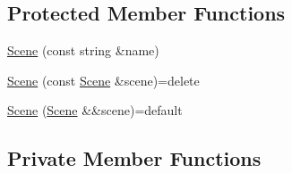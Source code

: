 \subsection*{Protected Member Functions}
\begin{DoxyCompactItemize}
\item 
\hyperlink{classmage_1_1_scene_aab61b38547fc53aa9c5b3b559f4d2e26}{Scene} (const string \&name)
\item 
\hyperlink{classmage_1_1_scene_a88d83ccb2e10549d5370f850b2b4c228}{Scene} (const \hyperlink{classmage_1_1_scene}{Scene} \&scene)=delete
\item 
\hyperlink{classmage_1_1_scene_a35b8fc4242c2348e53014b96416fc3d3}{Scene} (\hyperlink{classmage_1_1_scene}{Scene} \&\&scene)=default
\end{DoxyCompactItemize}
\subsection*{Private Member Functions}
